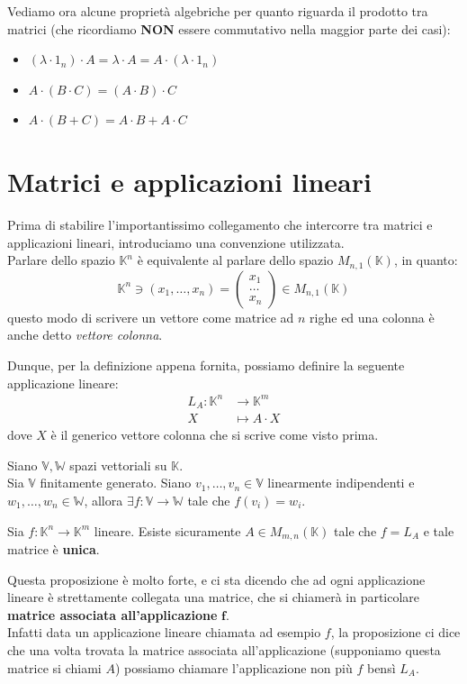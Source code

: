 \documentclass[12pt]{report}
\newcommand{\K}{\mathbb{K}}
\newcommand{\V}{\mathbb{V}}
\newcommand{\W}{\mathbb{W}}
\newcommand{\genericvector}[1]{(#1_1, \dots, #1_n)}
\newcommand{\vectors}[1]{#1_1, \dots, #1_n}
\begin{document}
	Vediamo ora alcune proprietà algebriche per quanto riguarda il prodotto tra matrici (che ricordiamo \textbf{NON} essere commutativo nella maggior parte dei casi):
	\begin{itemize}
		\item $(\lambda \cdot 1_n) \cdot A = \lambda \cdot A = A \cdot (\lambda \cdot 1_n)$
		\item $A \cdot (B \cdot C) = (A \cdot B) \cdot C$
		\item $A \cdot (B + C) = A \cdot B + A \cdot C$
	\end{itemize}
	
	\section{Matrici e applicazioni lineari}
	Prima di stabilire l'importantissimo collegamento che intercorre tra matrici e applicazioni lineari, introduciamo una convenzione utilizzata.\\
	Parlare dello spazio $\K^n$ è equivalente al parlare dello spazio $M_{n,1}(\K)$, in quanto:
	\[
		\K^n \ni \genericvector{x} = 
		\begin{pmatrix}
			x_1\\
			\dots\\
			x_n
		\end{pmatrix}
		\in M_{n, 1}(\K)
	\]
	questo modo di scrivere un vettore come matrice ad $n$ righe ed una colonna è anche detto \textit{vettore colonna}.
	
	Dunque, per la definizione appena fornita, possiamo definire la seguente applicazione lineare:
	\[
		\begin{aligned}
			L_A : \K^n &\to \K^m\\
			X &\mapsto A \cdot X
		\end{aligned}
	\]
	dove $X$ è il generico vettore colonna che si scrive come visto prima.
	
	\begin{proposizione}{}{}
		Siano $\V, \W$ spazi vettoriali su $\K$.\\
		Sia $\V$ finitamente generato.
		Siano $\vectors{v} \in \V$ linearmente indipendenti e $\vectors{w} \in \W$, allora $\exists f: \V \to \W$ tale che $f(v_i) = w_i$.
	\end{proposizione}
	
	\begin{proposizione}{}{}
		Sia $f: \K^n \to \K^m$ lineare.
		Esiste sicuramente $A \in M_{m,n}(\K)$ tale che $f = L_A$ e tale matrice è \textbf{unica}.
	\end{proposizione}
	Questa proposizione è molto forte, e ci sta dicendo che ad ogni applicazione lineare è strettamente collegata una matrice, che si chiamerà in particolare \textbf{matrice associata all'applicazione} $\mathbf{f}$.\\
	Infatti data un applicazione lineare chiamata ad esempio $f$, la proposizione ci dice che una volta trovata la matrice associata all'applicazione (supponiamo questa matrice si chiami $A$) possiamo chiamare l'applicazione non più $f$ bensì $L_A$.
	
\end{document}
